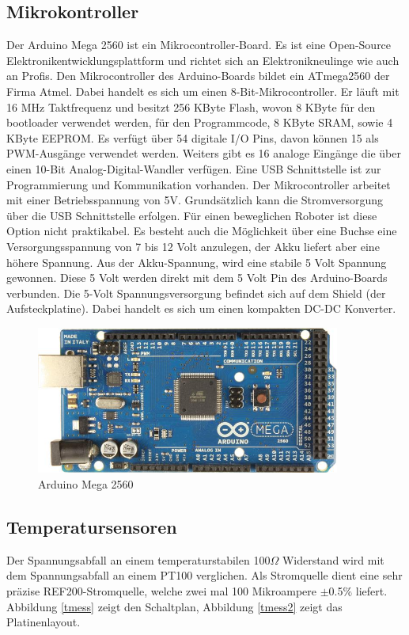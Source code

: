 \documentclass[a4paper,bibtotoc,oneside]{scrbook}
\begin{document}
\subsection{Mikrokontroller}\thispagestyle{empty}
Der Arduino Mega 2560 ist ein Mikrocontroller-Board. Es ist eine Open-Source Elektronikentwicklungsplattform und richtet sich an Elektronikneulinge wie auch an Profis. Den Mikrocontroller des Arduino-Boards bildet ein ATmega2560 der Firma Atmel. Dabei handelt es sich um einen 8-Bit-Mikrocontroller.  Er läuft mit 16 MHz Taktfrequenz und besitzt 256 KByte Flash, wovon 8 KByte für den bootloader verwendet werden, für den Programmcode, 8 KByte SRAM, sowie 4 KByte EEPROM.  Es verfügt über 54 digitale I/O Pins, davon können 15 als PWM-Ausgänge verwendet werden. Weiters gibt es 16 analoge Eingänge die über einen 10-Bit Analog-Digital-Wandler verfügen.
Eine USB Schnittstelle ist zur Programmierung und Kommunikation vorhanden.
Der Mikrocontroller arbeitet mit einer Betriebsspannung von 5V. Grundsätzlich kann die Stromversorgung über die USB Schnittstelle erfolgen. Für einen beweglichen Roboter ist diese Option nicht praktikabel. Es besteht auch die Möglichkeit über eine Buchse eine Versorgungsspannung von 7 bis 12 Volt anzulegen, der Akku liefert aber eine höhere Spannung. Aus der Akku-Spannung, wird eine stabile 5 Volt Spannung gewonnen. Diese 5 Volt werden direkt mit dem 5 Volt Pin des Arduino-Boards verbunden. Die 5-Volt Spannungsversorgung befindet sich auf dem Shield (der Aufsteckplatine). Dabei handelt es sich um einen kompakten DC-DC Konverter. 

 



\begin{figure}[htbp]
\centering
\includegraphics[width=100mm]{img/ArduinoMega2.jpg}
\caption[Arduino Mega 2560]{Arduino Mega 2560}\label{ardu}
\end{figure}

\subsection{Temperatursensoren}\thispagestyle{empty}
Der Spannungsabfall an einem temperaturstabilen 100$\Omega$ Widerstand wird mit dem Spannungsabfall an einem PT100 verglichen. Als Stromquelle dient eine sehr präzise REF200-Stromquelle\cite{ref200}, welche zwei mal 100 Mikroampere $\pm$0.5$\%$ liefert. Abbildung \ref{tmess} zeigt den Schaltplan, Abbildung \ref{tmess2} zeigt das Platinenlayout.
\end{document}
